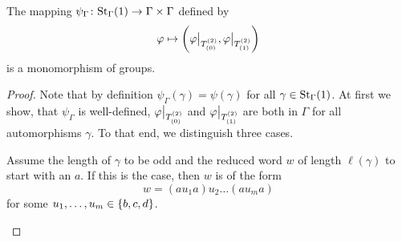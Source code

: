 \begin{lem}\label{thm:psi Gamma}
The mapping $\psi_\Gamma\colon\St[\Gamma]{1}\to\Gamma\times\Gamma$ defined by
\begin{equation*}
\varphi\mapsto\left(\varphi\big\vert_{\ST{(0)}},\varphi\big\vert_{\ST{(1)}}\right)
\end{equation*}
is a monomorphism of groups.
\end{lem}
\begin{proof}
Note that by definition $\psi_\Gamma(\gamma)=\psi(\gamma)$ for all $\gamma\in\St[\Gamma]{1}$. At first we show, that $\psi_\Gamma$ is well-defined, \ie $\varphi\big\vert_{\ST{(0)}}$ and $\varphi\big\vert_{\ST{(1)}}$ are both in $\Gamma$ for all automorphisms $\gamma$. To that end, we distinguish three cases.
\begin{clist}
\item Assume the length of $\gamma$ to be odd and the reduced word $w$ of length $\ell(\gamma)$ to start with an $a$. If this is the case, then $w$ is of the form
\begin{equation*}
w=(au_1a)u_2\ldots (au_ma)
\end{equation*}
for some $\seq[m]{u}\in\lbrace b,c,d\rbrace$.


\end{clist}
\end{proof}
